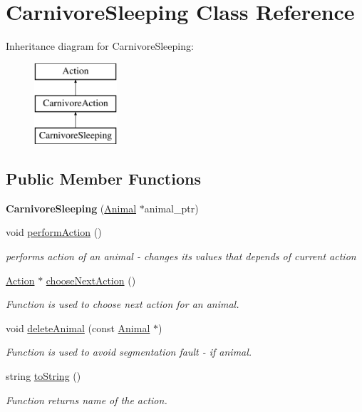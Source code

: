 \hypertarget{class_carnivore_sleeping}{}\section{Carnivore\+Sleeping Class Reference}
\label{class_carnivore_sleeping}
Inheritance diagram for Carnivore\+Sleeping\+:\begin{figure}[H]
\begin{center}
\leavevmode
\includegraphics[height=3.000000cm]{class_carnivore_sleeping}
\end{center}
\end{figure}
\subsection*{Public Member Functions}
\begin{DoxyCompactItemize}
\item 
\hypertarget{class_carnivore_sleeping_a80e590b906f475e74e02853d0a7878bf}{}{\bfseries Carnivore\+Sleeping} (\hyperlink{class_animal}{Animal} $\ast$animal\+\_\+ptr)\label{class_carnivore_sleeping_a80e590b906f475e74e02853d0a7878bf}

\item 
void \hyperlink{class_carnivore_sleeping_a22f44ca1cde98236c29bd58089c2af18}{perform\+Action} ()
\begin{DoxyCompactList}\small\item\em performs action of an animal -\/ changes it\textquotesingle{}s values that depends of current action \end{DoxyCompactList}\item 
\hyperlink{class_action}{Action} $\ast$ \hyperlink{class_carnivore_sleeping_ad6783bd94c20821e9736d9f2f38934ab}{choose\+Next\+Action} ()
\begin{DoxyCompactList}\small\item\em Function is used to choose next action for an animal. \end{DoxyCompactList}\item 
void \hyperlink{class_carnivore_sleeping_ac4cb50b95fe030543e7a7de019c35383}{delete\+Animal} (const \hyperlink{class_animal}{Animal} $\ast$)
\begin{DoxyCompactList}\small\item\em Function is used to avoid segmentation fault -\/ if animal. \end{DoxyCompactList}\item 
string \hyperlink{class_carnivore_sleeping_a2805a35db94114af285978b9820f0f18}{to\+String} ()
\begin{DoxyCompactList}\small\item\em Function returns name of the action. \end{DoxyCompactList}\end{DoxyCompactItemize}
